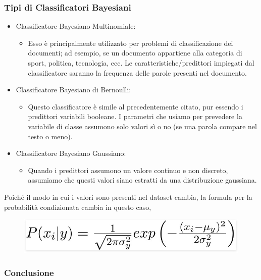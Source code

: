 \subsubsection{Tipi di Classificatori Bayesiani}
\begin{itemize}
\item Classificatore Bayesiano Multinomiale:
\begin{itemize}
\item Esso è principalmente utilizzato per problemi di classificazione dei documenti; ad esempio, se un documento appartiene alla categoria di sport, politica, tecnologia, ecc. Le caratteristiche/predittori impiegati dal classificatore saranno la frequenza delle parole presenti nel documento.
\end{itemize}
\item Classificatore Bayesiano di Bernoulli:
\begin{itemize}
\item Questo classificatore è simile al precedentemente citato, pur essendo i predittori variabili booleane. I parametri che usiamo per prevedere la variabile di classe assumono solo valori sì o no (se una parola compare nel testo o meno).
\end{itemize}
\item Classificatore Bayesiano Gaussiano:
\begin{itemize}
\item Quando i predittori assumono un valore continuo e non discreto, assumiamo che questi valori siano estratti da una distribuzione gaussiana.
\end{itemize}
\end{itemize}
Poiché il modo in cui i valori sono presenti nel dataset cambia, la formula per la probabilità condizionata cambia in questo caso,
\begin{figure}
    \begin{center}    
        \includegraphics[width=0.9\linewidth]{images/image24.jpeg}
    \end{center}
\end{figure}

\subsubsection{Conclusione}
 
